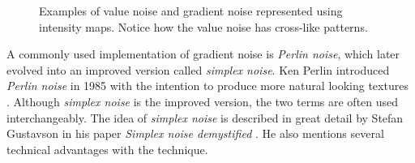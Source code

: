 \begin{figure}[h!]
  \caption{Examples of value noise and gradient noise represented using intensity maps. Notice how the value noise has cross-like patterns.}
  \label{fig:noisetypes}
\end{figure}

A commonly used implementation of gradient noise is \textit{Perlin noise}, which later evolved into an improved version called \textit{simplex noise}.
Ken Perlin introduced \textit{Perlin noise} in 1985 with the intention to produce more natural looking textures \cite{perlin_noise}.
Although \textit{simplex noise} is the improved version, the two terms are often used interchangeably. The idea of \textit{simplex noise} is described in great detail by Stefan Gustavson in his paper \textit{Simplex noise demystified} \cite{simplex_noise}.
He also mentions several technical advantages with the technique.